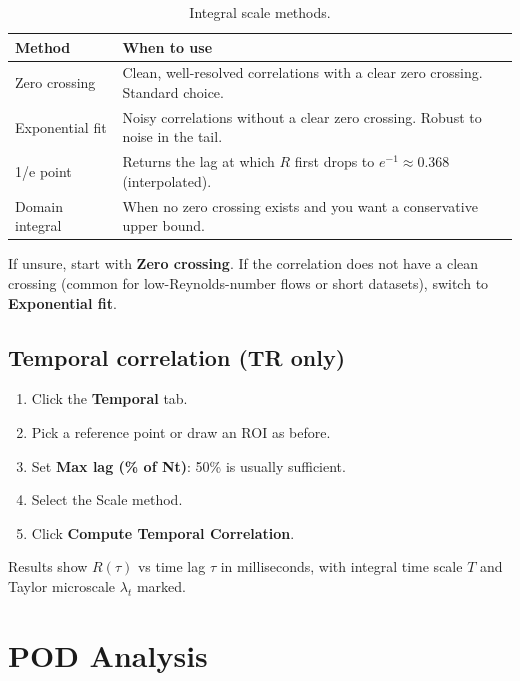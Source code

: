\documentclass[11pt, a4paper]{report}
\newcommand{\uipth}[1]{\textbf{\textcolor{upblue}{#1}}}
\begin{document}
\begin{table}[htbp]
\centering
\caption{Integral scale methods.}
\label{tab:scalemethods}
\begin{tabular}{lp{9cm}}
\toprule
\textbf{Method} & \textbf{When to use} \\
\midrule
Zero crossing   & Clean, well-resolved correlations with a clear zero crossing. Standard choice. \\
Exponential fit & Noisy correlations without a clear zero crossing. Robust to noise in the tail. \\
1/e point       & Returns the lag at which $R$ first drops to $e^{-1} \approx 0.368$ (interpolated). \\
Domain integral & When no zero crossing exists and you want a conservative upper bound. \\
\bottomrule
\end{tabular}
\end{table}

\begin{tipbox}
If unsure, start with \textbf{Zero crossing}. If the correlation does not have a clean crossing (common for low-Reynolds-number flows or short datasets), switch to \textbf{Exponential fit}.
\end{tipbox}

\section{Temporal correlation (TR only)}

\begin{stepbox}
\begin{enumerate}[leftmargin=1.5em, topsep=2pt]
  \item Click the \uipth{Temporal} tab.
  \item Pick a reference point or draw an ROI as before.
  \item Set \uipth{Max lag (\% of Nt)}: 50\% is usually sufficient.
  \item Select the Scale method.
  \item Click \uipth{Compute Temporal Correlation}.
\end{enumerate}
\end{stepbox}

Results show $R(\tau)$ vs time lag $\tau$ in milliseconds, with integral time scale $T$ and Taylor microscale $\lambda_t$ marked.

\chapter{POD Analysis}
\label{ch:pod}
\end{document}
